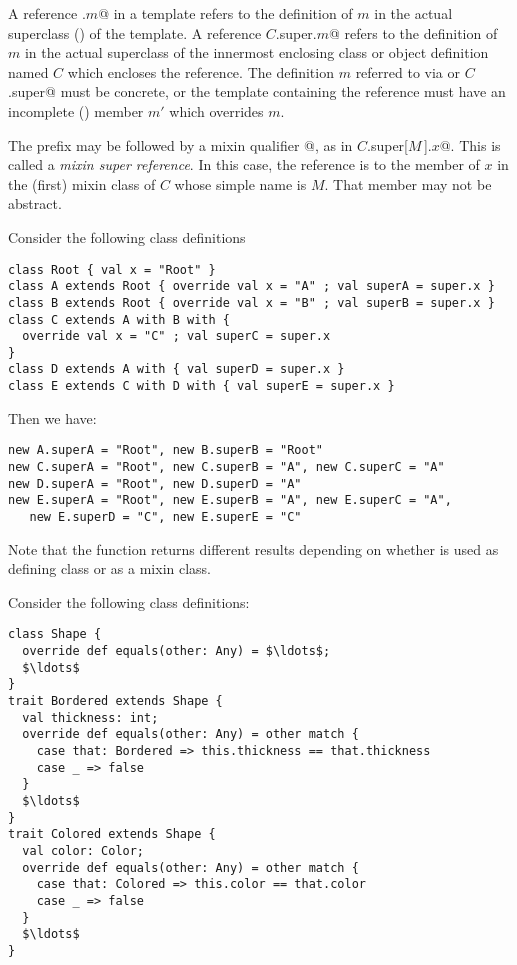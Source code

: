 \documentclass[a4paper,12pt,twoside,titlepage]{book}
\begin{document}
A reference \lstinline@super.$m$@ in a template refers to the
definition of $m$ in the actual superclass ()
of the template.  A reference \lstinline@$C$.super.$m$@ refers to the
definition of $m$ in the actual superclass of the innermost enclosing
class or object definition named $C$ which encloses the reference. The
definition $m$ referred to via  or \lstinline@$C$.super@
must be concrete, or the template containing the reference must have an
incomplete () member $m'$ which overrides $m$.

The  prefix may be followed by a mixin qualifier
\lstinline@[$M\,$]@, as in \lstinline@$C$.super[$M\,$].$x$@. This is called a {\em mixin
super reference}.  In this case, the reference is to the member of
$x$ in the (first) mixin class of $C$ whose simple name
is $M$. That member may not be abstract.

\example\label{ex:super}
Consider the following class definitions

\begin{lstlisting}
class Root { val x = "Root" }
class A extends Root { override val x = "A" ; val superA = super.x }
class B extends Root { override val x = "B" ; val superB = super.x }
class C extends A with B with { 
  override val x = "C" ; val superC = super.x 
}
class D extends A with { val superD = super.x }
class E extends C with D with { val superE = super.x }
\end{lstlisting}
Then we have:
\begin{lstlisting}
new A.superA = "Root", new B.superB = "Root"
new C.superA = "Root", new C.superB = "A", new C.superC = "A"
new D.superA = "Root", new D.superD = "A"
new E.superA = "Root", new E.superB = "A", new E.superC = "A",
   new E.superD = "C", new E.superE = "C"
\end{lstlisting}
Note that the  function returns different results
depending on whether  is used as defining class or as a mixin class.

\example Consider the following class definitions:
\begin{lstlisting}
class Shape {
  override def equals(other: Any) = $\ldots$;
  $\ldots$
}
trait Bordered extends Shape {
  val thickness: int;
  override def equals(other: Any) = other match {
    case that: Bordered => this.thickness == that.thickness
    case _ => false
  }
  $\ldots$
}
trait Colored extends Shape {
  val color: Color;
  override def equals(other: Any) = other match {
    case that: Colored => this.color == that.color
    case _ => false
  }
  $\ldots$
}
\end{lstlisting}
\end{document}
